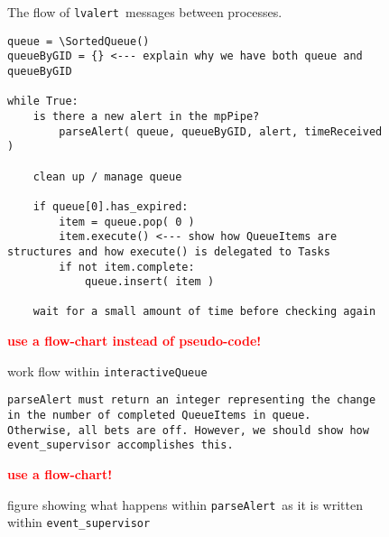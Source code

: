 \documentclass{article}
\newcommand{\FIXME}[1]{\textcolor{red}{\textbf{#1}}}
\newcommand{\alert}{\texttt{lvalert}~}
\newcommand{\interactiveQueue}{\texttt{interactiveQueue}~}
\newcommand{\parseAlert}{\texttt{parseAlert}~}
\newcommand{\SortedQueue}{\texttt{SortedQueue}~}
\newcommand{\eventSupervisor}{\texttt{event\_supervisor}~}
\begin{document}
\begin{figure}
    \caption{The flow of \alert messages between processes.}
    \label{fig: alert flow}
\end{figure}

\begin{figure}

\begin{verbatim}
queue = \SortedQueue()
queueByGID = {} <--- explain why we have both queue and queueByGID

while True:
    is there a new alert in the mpPipe?
        parseAlert( queue, queueByGID, alert, timeReceived )

    clean up / manage queue

    if queue[0].has_expired:
        item = queue.pop( 0 )
        item.execute() <--- show how QueueItems are structures and how execute() is delegated to Tasks
        if not item.complete:
            queue.insert( item )

    wait for a small amount of time before checking again
\end{verbatim}

\FIXME{use a flow-chart instead of pseudo-code!}

    \caption{work flow within \interactiveQueue}
    \label{fig: interactiveQueue}
\end{figure}

\begin{figure}

\begin{verbatim}
parseAlert must return an integer representing the change in the number of completed QueueItems in queue.
Otherwise, all bets are off. However, we should show how event_supervisor accomplishes this.
\end{verbatim}

\FIXME{use a flow-chart!}

    \caption{figure showing what happens within \parseAlert as it is written within \eventSupervisor}
    \label{fig: parseAlert}
\end{figure}
\end{document}
